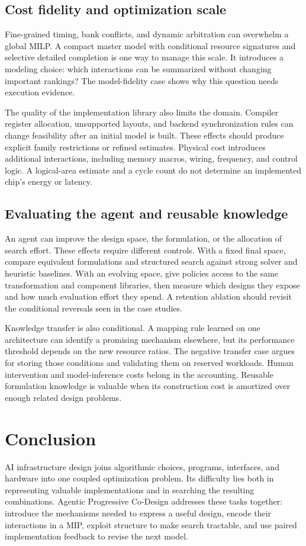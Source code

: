 \subsection{Cost fidelity and optimization scale}
Fine-grained timing, bank conflicts, and dynamic arbitration can overwhelm a global MILP. A compact master model with conditional resource signatures and selective detailed completion is one way to manage this scale. It introduces a modeling choice: which interactions can be summarized without changing important rankings? The model-fidelity case shows why this question needs execution evidence.

The quality of the implementation library also limits the domain. Compiler register allocation, unsupported layouts, and backend synchronization rules can change feasibility after an initial model is built. These effects should produce explicit family restrictions or refined estimates. Physical cost introduces additional interactions, including memory macros, wiring, frequency, and control logic. A logical-area estimate and a cycle count do not determine an implemented chip's energy or latency.

\subsection{Evaluating the agent and reusable knowledge}
An agent can improve the design space, the formulation, or the allocation of search effort. These effects require different controls. With a fixed final space, compare equivalent formulations and structured search against strong solver and heuristic baselines. With an evolving space, give policies access to the same transformation and component libraries, then measure which designs they expose and how much evaluation effort they spend. A retention ablation should revisit the conditional reversals seen in the case studies.

Knowledge transfer is also conditional. A mapping rule learned on one architecture can identify a promising mechanism elsewhere, but its performance threshold depends on the new resource ratios. The negative transfer case argues for storing those conditions and validating them on reserved workloads. Human intervention and model-inference costs belong in the accounting. Reusable formulation knowledge is valuable when its construction cost is amortized over enough related design problems.

\section{Conclusion}
AI infrastructure design joins algorithmic choices, programs, interfaces, and hardware into one coupled optimization problem. Its difficulty lies both in representing valuable implementations and in searching the resulting combinations. Agentic Progressive Co-Design addresses these tasks together: introduce the mechanisms needed to express a useful design, encode their interactions in a MIP, exploit structure to make search tractable, and use paired implementation feedback to revise the next model.

